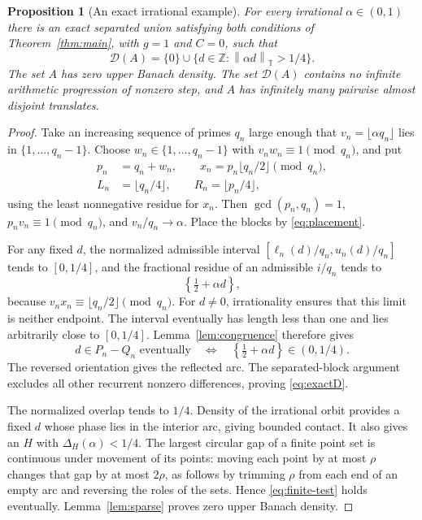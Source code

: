 \documentclass[11pt,leqno]{amsart}
\numberwithin{equation}{section}
\newtheorem{proposition}[theorem]{Proposition}
\theoremstyle{definition}
\theoremstyle{remark}
\newcommand{\Z}{\mathbb Z}
\newcommand{\T}{\mathbb T}
\newcommand{\D}{\mathcal D}
\newcommand{\normt}[1]{\left\|#1\right\|_{\T}}
\newcommand{\fr}[1]{\left\{#1\right\}}
\newcommand{\gap}{\Delta}
\begin{document}
\begin{proposition}[An exact irrational example]\label{prop:irrational}
For every irrational $\alpha\in(0,1)$ there is an exact separated union satisfying both conditions of Theorem~\ref{thm:main}, with $g=1$ and $C=0$, such that
\begin{equation}\label{eq:exactD}
\D(A)=\{0\}\cup\{d\in\Z:\normt{\alpha d}>1/4\}.
\end{equation}
The set $A$ has zero upper Banach density. The set $\D(A)$ contains no infinite arithmetic progression of nonzero step, and $A$ has infinitely many pairwise almost disjoint translates.
\end{proposition}
\begin{proof}
Take an increasing sequence of primes $q_n$ large enough that $v_n=\lfloor\alpha q_n\rfloor$ lies in $\{1,\ldots,q_n-1\}$. Choose $w_n\in\{1,\ldots,q_n-1\}$ with $v_nw_n\equiv1\pmod{q_n}$, and put
\begin{equation}\label{eq:irrationalparameters}
\begin{split}
p_n&=q_n+w_n,\qquad
x_n=p_n\lfloor q_n/2\rfloor\pmod{q_n},\\
L_n&=\lfloor q_n/4\rfloor,\qquad
R_n=\lfloor p_n/4\rfloor,
\end{split}
\end{equation}
using the least nonnegative residue for $x_n$. Then $\gcd(p_n,q_n)=1$, $p_nv_n\equiv1\pmod{q_n}$, and $v_n/q_n\to\alpha$. Place the blocks by \eqref{eq:placement}.

For any fixed $d$, the normalized admissible interval $[\ell_n(d)/q_n,u_n(d)/q_n]$ tends to $[0,1/4]$, and the fractional residue of an admissible $i/q_n$ tends to
\[
\fr{\tfrac12+\alpha d},
\]
because $v_nx_n\equiv\lfloor q_n/2\rfloor\pmod{q_n}$. For $d\ne0$, irrationality ensures that this limit is neither endpoint. The interval eventually has length less than one and lies arbitrarily close to $[0,1/4]$. Lemma~\ref{lem:congruence} therefore gives
\[
d\in P_n-Q_n\text{ eventually}
\quad\Longleftrightarrow\quad
\fr{\tfrac12+\alpha d}\in(0,1/4).
\]
The reversed orientation gives the reflected arc. The separated-block argument excludes all other recurrent nonzero differences, proving \eqref{eq:exactD}.

The normalized overlap tends to $1/4$. Density of the irrational orbit provides a fixed $d$ whose phase lies in the interior arc, giving bounded contact. It also gives an $H$ with $\gap_H(\alpha)<1/4$. The largest circular gap of a finite point set is continuous under movement of its points: moving each point by at most $\rho$ changes that gap by at most $2\rho$, as follows by trimming $\rho$ from each end of an empty arc and reversing the roles of the sets. Hence \eqref{eq:finite-test} holds eventually. Lemma~\ref{lem:sparse} proves zero upper Banach density.


\end{proof}
\end{document}
